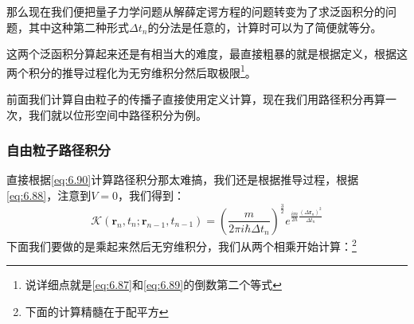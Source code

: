 \documentclass[a4paper,zihao=-4,linespread=1]{ctexrep}
\begin{document}
	那么现在我们便把量子力学问题从解薛定谔方程的问题转变为了求泛函积分的问题，其中这种第二种形式$\Delta t_n$的分法是任意的，计算时可以为了简便就等分。
	
	这两个泛函积分算起来还是有相当大的难度，最直接粗暴的就是根据定义，根据这两个积分的推导过程化为无穷维积分然后取极限\footnote{说详细点就是\ref{eq:6.87}和\ref{eq:6.89}的倒数第二个等式}。
	
	前面我们计算自由粒子的传播子直接使用定义计算，现在我们用路径积分再算一次，我们就以位形空间中路径积分为例。
	\subsubsection{自由粒子路径积分}
	直接根据\ref{eq:6.90}计算路径积分那太难搞，我们还是根据推导过程，根据\ref{eq:6.88}，注意到$V=0$，我们得到：
	\begin{equation}
		\label{eq:6.91}
		\mathcal{K}\left(\mathbf{r}_n, t_n ; \mathbf{r}_{n-1}, t_{n-1}\right)=\left(\frac{m}{2 \pi i \hbar \Delta t_n}\right)^{\frac{3}{2}} e^{\frac{im}{2\hbar}\frac{({\Delta\mathbf{r}}_n)^2}{ \Delta t_n}}
	\end{equation}
	下面我们要做的是乘起来然后无穷维积分，我们从两个相乘开始计算：\footnote{下面的计算精髓在于配平方}
\end{document}
